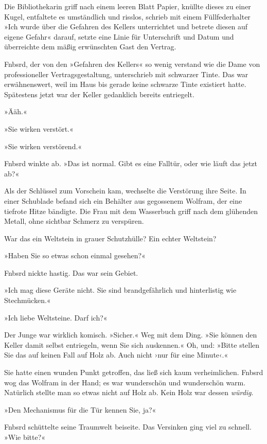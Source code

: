 Die Bibliothekarin griff nach einem leeren Blatt Papier, knüllte dieses zu einer Kugel, entfaltete es umständlich und risslos, schrieb mit einem Füllfederhalter »Ich wurde über die Gefahren des Kellers unterrichtet und betrete diesen auf eigene Gefahr« darauf, setzte eine Linie für Unterschrift und Datum und überreichte dem mäßig erwünschten Gast den Vertrag.

Fnbsrd, der von den »Gefahren des Kellers« so wenig verstand wie die Dame von professioneller Vertragsgestaltung, unterschrieb mit schwarzer Tinte. Das war erwähnenswert, weil im Haus bis gerade keine schwarze Tinte existiert hatte. Spätestens jetzt war der Keller gedanklich bereits entriegelt.

»Ääh.«

»Sie wirken verstört.«

»Sie wirken verstörend.«

Fnbsrd winkte ab. »Das ist normal. Gibt es eine Falltür, oder wie läuft das jetzt ab?«

Als der Schlüssel zum Vorschein kam, wechselte die Verstörung ihre Seite. In einer Schublade befand sich ein Behälter aus gegossenem Wolfram, der eine tiefrote Hitze bändigte. Die Frau mit dem Wasserbuch griff nach dem glühenden Metall, ohne sichtbar Schmerz zu verspüren.

War das ein Weltstein in grauer Schutzhülle? Ein echter Weltstein?

»Haben Sie so etwas schon einmal gesehen?«

Fnbsrd nickte hastig. Das war sein Gebiet.

»Ich mag diese Geräte nicht. Sie sind brandgefährlich und hinterlistig wie Stechmücken.«

»Ich liebe Weltsteine. Darf ich?«

Der Junge war wirklich komisch. »Sicher.« Weg mit dem Ding. »Sie können den Keller damit selbst entriegeln, wenn Sie sich auskennen.« Oh, und: »Bitte stellen Sie das auf keinen Fall auf Holz ab. Auch nicht ›nur für eine Minute‹.«

Sie hatte einen wunden Punkt getroffen, das ließ sich kaum verheimlichen. Fnbsrd wog das Wolfram in der Hand; es war wunderschön und wunderschön warm. Natürlich stellte man so etwas nicht auf Holz ab. Kein Holz war dessen \emph{würdig}.

»Den Mechanismus für die Tür kennen Sie, ja?«

Fnbsrd schüttelte seine Traumwelt beiseite. Das Versinken ging viel zu schnell. »Wie bitte?«

